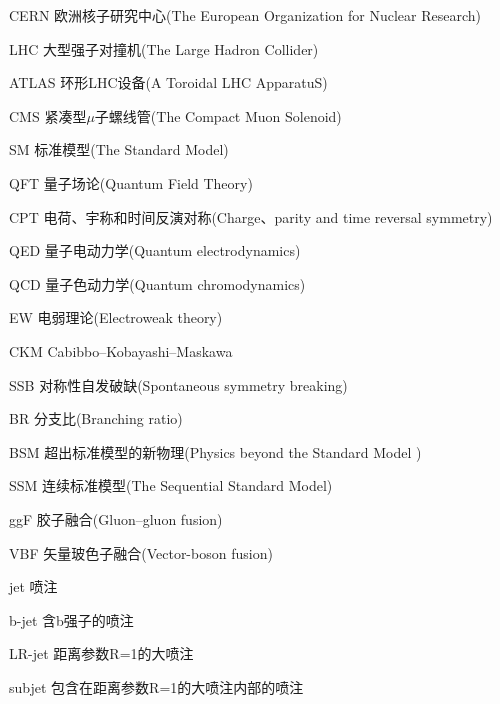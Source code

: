 
\begin{denotation}[3cm]
\item[CERN] 欧洲核子研究中心(The European Organization for Nuclear Research)
\item[LHC] 大型强子对撞机(The Large Hadron Collider)
\item[ATLAS] 环形LHC设备(A Toroidal LHC ApparatuS)
\item[CMS] 紧凑型$\mu$子螺线管(The Compact Muon Solenoid)
\item[SM] 标准模型(The Standard Model)
\item[QFT] 量子场论(Quantum Field Theory)
\item[CPT] 电荷、宇称和时间反演对称(Charge、parity and time reversal symmetry)
\item [QED] 量子电动力学(Quantum electrodynamics)
\item[QCD] 量子色动力学(Quantum chromodynamics)
\item[EW] 电弱理论(Electroweak theory)
\item[CKM] Cabibbo–Kobayashi–Maskawa
\item[SSB] 对称性自发破缺(Spontaneous symmetry breaking)
\item[BR] 分支比(Branching ratio)
\item[BSM] 超出标准模型的新物理(Physics beyond the Standard Model )
\item[SSM] 连续标准模型(The Sequential Standard Model)
\item[ggF] 胶子融合(Gluon–gluon fusion)
\item[VBF] 矢量玻色子融合(Vector-boson fusion)
\item[jet] 喷注
\item[b-jet] 含b强子的喷注
\item[LR-jet] 距离参数R=1的大喷注
\item[subjet] 包含在距离参数R=1的大喷注内部的喷注

\end{denotation}






